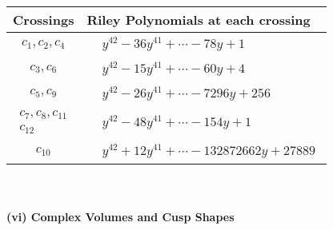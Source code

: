 \documentclass[1p]{elsarticle_modified}
\theoremstyle{definition}
\begin{document}
\begin{tabular}{m{50pt}|m{274pt}}
Crossings & \hspace{64pt}Riley Polynomials at each crossing \\
\hline $$\begin{aligned}c_{1},c_{2},c_{4}\end{aligned}$$&$\begin{aligned}
&y^{42}-36 y^{41}+\cdots-78 y+1
\end{aligned}$\\
\hline $$\begin{aligned}c_{3},c_{6}\end{aligned}$$&$\begin{aligned}
&y^{42}-15 y^{41}+\cdots-60 y+4
\end{aligned}$\\
\hline $$\begin{aligned}c_{5},c_{9}\end{aligned}$$&$\begin{aligned}
&y^{42}-26 y^{41}+\cdots-7296 y+256
\end{aligned}$\\
\hline $$\begin{aligned}c_{7},c_{8},c_{11}\\c_{12}\end{aligned}$$&$\begin{aligned}
&y^{42}-48 y^{41}+\cdots-154 y+1
\end{aligned}$\\
\hline $$\begin{aligned}c_{10}\end{aligned}$$&$\begin{aligned}
&y^{42}+12 y^{41}+\cdots-132872662 y+27889
\end{aligned}$\\
\hline
\end{tabular}\\~\\
\newpage\flushleft \textbf{(vi) Complex Volumes and Cusp Shapes}
\end{document}
